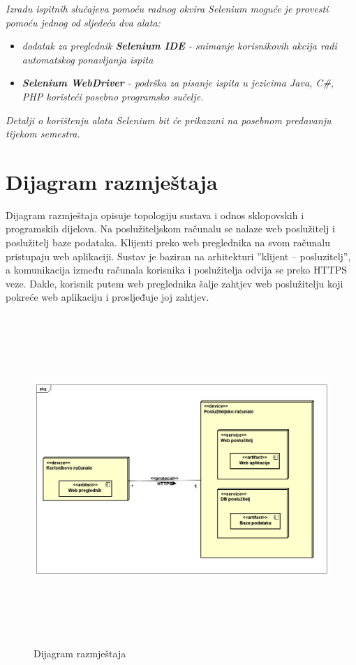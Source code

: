{			 \textit{Izradu ispitnih slučajeva pomoću radnog okvira Selenium moguće je provesti pomoću jednog od sljedeća dva alata:}
			 \begin{itemize}
			 	\item \textit{dodatak za preglednik \textbf{Selenium IDE} - snimanje korisnikovih akcija radi automatskog ponavljanja ispita	}
			 	\item \textit{\textbf{Selenium WebDriver} - podrška za pisanje ispita u jezicima Java, C\#, PHP koristeći posebno programsko sučelje.}
			 \end{itemize}
		 	\textit{Detalji o korištenju alata Selenium bit će prikazani na posebnom predavanju tijekom semestra.}
			
			\eject 
		
		
		\section{Dijagram razmještaja}
		
			{Dijagram razmještaja opisuje topologiju sustava i odnos sklopovskih i programskih dijelova. Na poslužiteljskom računalu se nalaze web poslužitelj i poslužitelj baze podataka. Klijenti preko web preglednika na svom računalu pristupaju web aplikaciji. Sustav je baziran na arhitekturi ”klijent – posluzitelj”, a komunikacija između računala korisnika i poslužitelja odvija se preko HTTPS veze. Dakle, korisnik putem web preglednika šalje zahtjev web poslužitelju koji pokreće web aplikaciju i prosljeđuje joj zahtjev.}
			
			\begin{figure}[h]
				\centering
				\includegraphics[width=17.5cm,height=12.5cm]{deploymentDiagram}
				\caption{Dijagram razmještaja}
				\label{fig:pkg}
			\end{figure}
			
}
